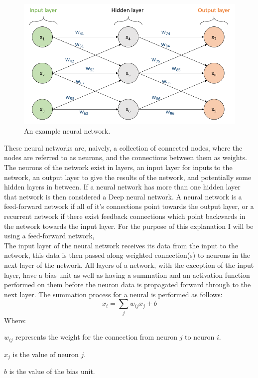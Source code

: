 \documentclass[10pt]{article}
\begin{document}
		\begin{figure}[h]			
			\includegraphics[scale=0.5]{img/network}
			\centering
			\caption{An example neural network.}
			\label{nnetwork}
		\end{figure}	
		
		These neural networks are, naively, a collection of connected nodes, where the nodes are referred to as neurons, and the connections between them as weights. The neurons of the network exist in layers, an input layer for inputs to the network, an output layer to give the results of the network, and potentially some hidden layers in between. If a neural network has more than one hidden layer that network is then considered a Deep neural network. A neural network is a feed-forward network if all of it's connections point towards the output layer, or a recurrent network if there exist feedback connections which point backwards in the network towards the input layer. For the purpose of this explanation I will be using a feed-forward network,\\
		
		The input layer of the neural network receives its data from the input to the network, this data is then passed along weighted connection(s) to neurons in the next layer of the network. All layers of a network, with the exception of the input layer, have a bias unit as well as having a summation and an activation function performed on them before the neuron data is propagated forward through to the next layer. The summation process for a neural is performed as follows:
		\begin{equation}
			x_i = \sum_{j} w_{ij} x_j + b 
		\end{equation}
		Where:
		\begin{list}{•}{•}
			\item $w_{ij}$ represents the weight for the connection from neuron $j$ to neuron $i$.
			\item $x_j$ is the value of neuron $j$.
			\item $b$ is the value of the bias unit.
		\end{list}
		
\end{document}
